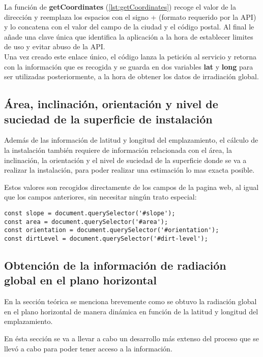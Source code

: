 La función de \textbf{getCoordinates} (\ref{lst:getCoordinates}) recoge el valor de la dirección y reemplaza los espacios con el signo + (formato requerido por la API) y lo concatena con el valor del campo de la ciudad y el código postal. Al final le añade una clave única que identifica la aplicación a la hora de establecer limites de uso y evitar abuso de la API.\\

Una vez creado este enlace único, el código lanza la petición al servicio y retorna con la información que es recogida y se guarda en dos variables \textbf{lat} y \textbf{long} para ser utilizadas posteriormente, a la hora de obtener los datos de irradiación global.

\subsection{Área, inclinación, orientación y nivel de suciedad de la superficie de instalación}

Además de las información de latitud y longitud del emplazamiento, el cálculo de la instalación también requiere de información relacionada con el área, la inclinación, la orientación y el nivel de suciedad de la superficie donde se va a realizar la instalación, para poder realizar una estimación lo mas exacta posible.

Estos valores son recogidos directamente de los campos de la pagina web, al igual que los campos anteriores, sin necesitar ningún trato especial:
\begin{lstlisting}[style=ES6, caption={Variables correspondientes a los campos indicados}]
const slope = document.querySelector('#slope');
const area = document.querySelector('#area');
const orientation = document.querySelector('#orientation');
const dirtLevel = document.querySelector('#dirt-level');
\end{lstlisting}

\subsection{Obtención de la información de radiación global en el plano horizontal}

En la sección teórica se menciona brevemente como se obtuvo la radiación global en el plano horizontal de manera dinámica en función de la latitud y longitud del emplazamiento.

En ésta sección se va a llevar a cabo un desarrollo más extenso del proceso que se llevó a cabo para poder tener acceso a la información.

